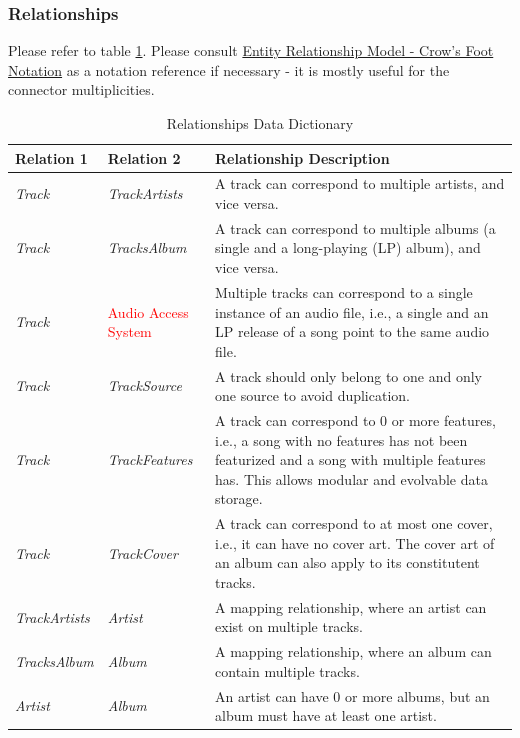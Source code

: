 \documentclass[12pt]{article}
\begin{document}
\subsubsection{Relationships}
Please refer to table \ref{tbl:relsh-data-dict}. Please consult \href{https://en.wikipedia.org/wiki/Entity%E2%80%93relationship_model#Crow's_foot_notation}{Entity Relationship Model - Crow's Foot Notation} as a notation reference if necessary - it is mostly useful for the connector multiplicities.
\begin{table}[htbp]
  \centering
  \begin{tabular}{ p{.175\linewidth} || p{.175\linewidth} || p{.55\linewidth} }
    \textbf{Relation 1} & \textbf{Relation 2} & \textbf{Relationship Description} \\
    \toprule
    \emph{Track} & \emph{TrackArtists} & A track can correspond to multiple artists, and vice versa. \\
    \emph{Track} & \emph{TracksAlbum} & A track can correspond to multiple albums (a single and a long-playing (LP) album), and vice versa. \\
    \emph{Track} & \textcolor{red}{Audio Access System} & Multiple tracks can correspond to a single instance of an audio file, i.e., a single and an LP release of a song point to the same audio file. \\
    \emph{Track} & \emph{TrackSource} & A track should only belong to one and only one source to avoid duplication. \\
    \emph{Track} & \emph{TrackFeatures} & A track can correspond to 0 or more features, i.e., a song with no features has not been featurized and a song with multiple features has. This allows modular and evolvable data storage. \\
    \emph{Track} & \emph{TrackCover} & A track can correspond to at most one cover, i.e., it can have no cover art. The cover art of an album can also apply to its constitutent tracks. \\
    \emph{TrackArtists} & \emph{Artist} & A mapping relationship, where an artist can exist on multiple tracks. \\
    \emph{TracksAlbum} & \emph{Album} & A mapping relationship, where an album can contain multiple tracks. \\
    \emph{Artist} & \emph{Album} & An artist can have 0 or more albums, but an album must have at least one artist. 
  \end{tabular}
  \label{tbl:relsh-data-dict}
  \caption{Relationships Data Dictionary}
\end{table}
\end{document}
